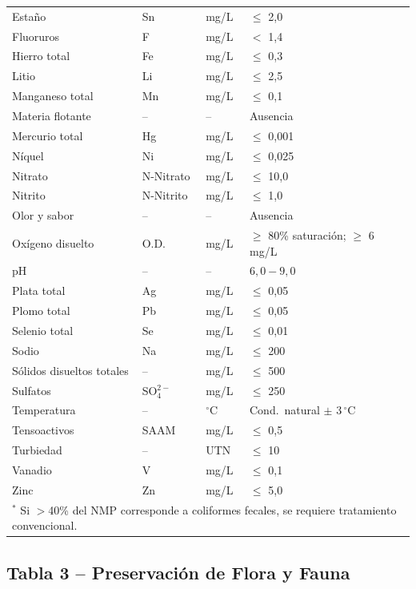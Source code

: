 \documentclass[12pt,a4paper]{article}
\begin{document}
\begin{longtable}{p{4.5cm}p{2.0cm}p{2.0cm}p{3.5cm}}
Esta\~no & Sn & mg/L & $\leq$ 2,0 \\
Fluoruros & F & mg/L & $<$ 1,4 \\
Hierro total & Fe & mg/L & $\leq$ 0,3 \\
Litio & Li & mg/L & $\leq$ 2,5 \\
Manganeso total & Mn & mg/L & $\leq$ 0,1 \\
Materia flotante & -- & -- & Ausencia \\
Mercurio total & Hg & mg/L & $\leq$ 0,001 \\
N\'iquel & Ni & mg/L & $\leq$ 0,025 \\
Nitrato & N-Nitrato & mg/L & $\leq$ 10,0 \\
Nitrito & N-Nitrito & mg/L & $\leq$ 1,0 \\
Olor y sabor & -- & -- & Ausencia \\
Ox\'igeno disuelto & O.D. & mg/L & $\geq$ 80\% saturaci\'on; $\geq$ 6 mg/L \\
pH & -- & -- & $6,0 - 9,0$ \\
Plata total & Ag & mg/L & $\leq$ 0,05 \\
Plomo total & Pb & mg/L & $\leq$ 0,05 \\
Selenio total & Se & mg/L & $\leq$ 0,01 \\
Sodio & Na & mg/L & $\leq$ 200 \\
S\'olidos disueltos totales & -- & mg/L & $\leq$ 500 \\
Sulfatos & SO$_4^{2-}$ & mg/L & $\leq$ 250 \\
Temperatura & -- & $^\circ$C & Cond.\ natural $\pm$ 3\,$^\circ$C \\
Tensoactivos & SAAM & mg/L & $\leq$ 0,5 \\
Turbiedad & -- & UTN & $\leq$ 10 \\
Vanadio & V & mg/L & $\leq$ 0,1 \\
Zinc & Zn & mg/L & $\leq$ 5,0 \\
\multicolumn{4}{l}{\scriptsize $^*$ Si $>$40\% del NMP corresponde a coliformes fecales, se requiere tratamiento convencional.}\\
\end{longtable}
\normalsize

\subsection{Tabla 3 -- Preservaci\'on de Flora y Fauna}
\end{document}
